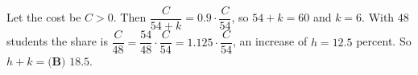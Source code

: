 Let the cost be $C>0$. Then $\dfrac{C}{54+k}=0.9\cdot\dfrac{C}{54}$, so $54+k=60$ and $k=6$. With $48$ students the share is $\dfrac{C}{48}=\dfrac{54}{48}\cdot\dfrac{C}{54}=1.125\cdot\dfrac C{54}$, an increase of $h=12.5$ percent. So $h+k=\boxed{\textbf{(B) }18.5}$.
